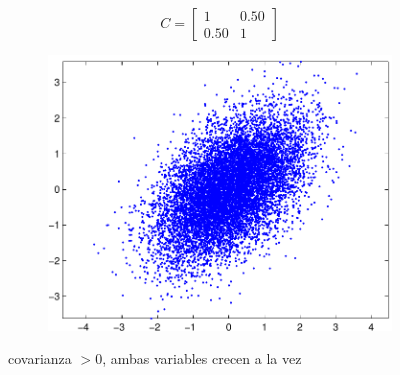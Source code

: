\documentclass[11pt]{scrartcl}
\begin{document}
\begin{figure}[h!]
 \centering
 \begin{subfigure}{0.49\textwidth}
$$
C = \begin{bmatrix}
1    & 0.50 \\
0.50 & 1   
\end{bmatrix}
$$ 
\end{subfigure}
 \begin{subfigure}{0.39\textwidth}
    \includegraphics[width=\textwidth]{img/matriz_covarianza_creciente}
 \end{subfigure}
 \caption{covarianza $> 0$, ambas variables crecen a la vez}
\end{figure}
\end{document}
